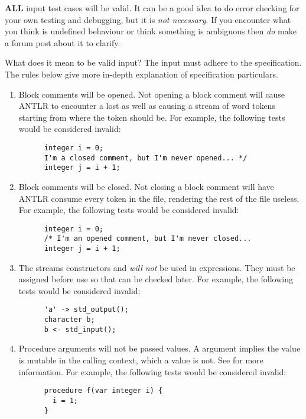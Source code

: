 \documentclass[../gazprea.tex]{subfiles}
\begin{document}
\textbf{ALL} input test cases will be valid. It can be a good idea to do error checking for your
own testing and debugging, but it is \textit{not necessary}. If you encounter what you think is
undefined behaviour or think something is ambiguous then \textit{do} make a forum post about it to
clarify.

What does it mean to be valid input? The input must adhere to the specification. The rules below
give more in-depth explanation of specification particulars.
\begin{enumerate}
  \item
    Block comments will be opened. Not opening a block comment will cause ANTLR to encounter a lost
    \code{*/} as well as causing a stream of word tokens starting from where the \code{/*} token
    should be. For example, the following tests would be considered invalid:
    \begin{lstlisting}
      integer i = 0;
      I'm a closed comment, but I'm never opened... */
      integer j = i + 1;
    \end{lstlisting}
  \item
    Block comments will be closed. Not closing a block comment will have ANTLR consume every token
    in the file, rendering the rest of the file useless. For example, the following tests would be
    considered invalid:
    \begin{lstlisting}
      integer i = 0;
      /* I'm an opened comment, but I'm never closed...
      integer j = i + 1;
    \end{lstlisting}
  \item
    The streams constructors  and  \textit{will not} be used
    in expressions. They must be assigned before use so that  can be checked
    later. For example, the following tests would be considered invalid:
    \begin{lstlisting}
      'a' -> std_output();
      character b;
      b <- std_input();
    \end{lstlisting}
  \item
    Procedure  arguments will not be passed  values. A  argument
    implies the value is mutable in the calling context, which a  value is not. See
     for more information. For example, the following tests would be
    considered invalid:
    \begin{lstlisting}
      procedure f(var integer i) {
        i = 1;
      }


\end{lstlisting}
\end{enumerate}
\end{document}
